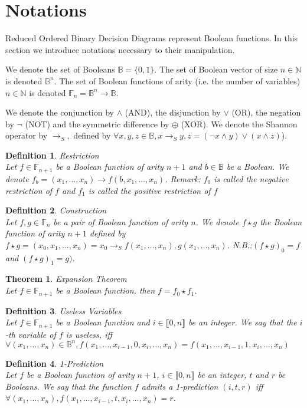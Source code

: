 \documentclass[a4paper,10pt]{article}
\newcommand{\shannon}[3]{#1 \longrightarrow_S #2, #3}
\newcommand{\N}{\mathbb{N}}%
\newcommand{\B}{\mathbb{B}}
\newcommand{\F}{\mathbb{F}}
\newtheorem{newtheo}{Theorem}
\newcommand{\theorem}[2]{\begin{newtheo}{\textsf{#1}\\} #2 \end{newtheo}}
\newtheorem{newdef}{Definition}
\newcommand{\definition}[2]{\begin{newdef}{#1\\}#2\end{newdef}}
\begin{document}
\section{Notations}

Reduced Ordered Binary Decision Diagrams represent Boolean functions.
In this section we introduce notations necessary to their manipulation.


We denote the set of Booleans $\B = \{0, 1\}$.
The set of Boolean vector of size $n\in\N$ is denoted $\B^n$.
The set of Boolean functions of arity (i.e. the number of variables) $n\in\N$ is denoted $\F_n = \B^n \longrightarrow \B$.


We denote the conjunction by $\land$ (AND), the disjunction by $\lor$ (OR), the negation by $\lnot$ (NOT) and the symmetric difference by $\oplus$ (XOR).
We denote the Shannon operator by $\shannon{}{}{}$ defined by $\forall x, y, z\in\B, \shannon{x}{y}{z} = (\lnot x \land y) \lor (x \land z)$).

\definition{Restriction}
{
	Let $f\in\F_{n+1}$ be a Boolean function of arity $n+1$ and $b\in\B$ be a Boolean.
	We denote $f_b = (x_1, \dots, x_n) \longrightarrow f(b, x_1, \dots, x_n)$.
	Remark: $f_0$ is called the negative restriction of $f$ and $f_1$ is called the positive restriction of $f$
}

\definition{Construction}
{
	Let $f, g\in\F_n$ be a pair of Boolean function of arity $n$.
	We denote $f\star{}g$ the Boolean function of arity $n+1$ defined by $ f\star{}g = (x_0, x_1, \dots, x_n) = \shannon{x_0}{f(x_1, \dots, x_n)}{g(x_1, \dots, x_n)}$.
	N.B.:$(f\star g)_0 = f$ and $ (f\star g)_1 = g)$.
}

\theorem{Expansion Theorem}{
Let $f\in\F_{n+1}$ be a Boolean function, then $f = f_0 \star f_1$.
}


\definition{Useless Variables}
{
Let $f\in\F_{n+1}$ be a Boolean function and $i\in\llbracket 0, n \rrbracket$ be an integer.
We say that the $i$-th variable of $f$ is useless, iff $\forall (x_1, \dots, x_n)\in\B^n, f(x_1, \dots, x_{i-1}, 0, x_i, \dots, x_n) = f(x_1, \dots, x_{i-1}, 1, x_i, \dots, x_n)$
}

\definition{1-Prediction}
{
Let $f$ be a Boolean function of arity $n+1$, $i\in\llbracket 0, n\rrbracket$ be an integer, $t$ and $r$ be Booleans.
We say that the function $f$ admits a 1-prediction $(i, t, r)$ iff $\forall (x_1, \dots, x_n), f(x_1, \dots, x_{i-1}, t, x_i, \dots, x_n) = r$.
}
\end{document}
